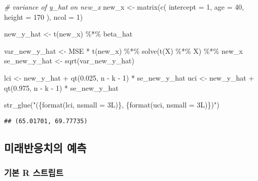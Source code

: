 \documentclass[
]{book}
\newenvironment{Shaded}{\begin{snugshade}}{\end{snugshade}}
\newcommand{\AttributeTok}[1]{\textcolor[rgb]{0.77,0.63,0.00}{#1}}
\newcommand{\CommentTok}[1]{\textcolor[rgb]{0.56,0.35,0.01}{\textit{#1}}}
\newcommand{\DecValTok}[1]{\textcolor[rgb]{0.00,0.00,0.81}{#1}}
\newcommand{\FloatTok}[1]{\textcolor[rgb]{0.00,0.00,0.81}{#1}}
\newcommand{\FunctionTok}[1]{\textcolor[rgb]{0.00,0.00,0.00}{#1}}
\newcommand{\NormalTok}[1]{#1}
\newcommand{\OtherTok}[1]{\textcolor[rgb]{0.56,0.35,0.01}{#1}}
\newcommand{\SpecialCharTok}[1]{\textcolor[rgb]{0.00,0.00,0.00}{#1}}
\newcommand{\StringTok}[1]{\textcolor[rgb]{0.31,0.60,0.02}{#1}}
\begin{document}
\begin{Shaded}
\begin{Highlighting}[]
\CommentTok{\# variance of y\_hat on new\_x}
\NormalTok{new\_x }\OtherTok{\textless{}{-}} \FunctionTok{matrix}\NormalTok{(}\FunctionTok{c}\NormalTok{(}
  \AttributeTok{intercept =} \DecValTok{1}\NormalTok{,}
  \AttributeTok{age =} \DecValTok{40}\NormalTok{,}
  \AttributeTok{height =} \DecValTok{170}
\NormalTok{), }\AttributeTok{ncol =} \DecValTok{1}\NormalTok{)}

\NormalTok{new\_y\_hat }\OtherTok{\textless{}{-}} \FunctionTok{t}\NormalTok{(new\_x) }\SpecialCharTok{\%*\%}\NormalTok{ beta\_hat}

\NormalTok{var\_new\_y\_hat }\OtherTok{\textless{}{-}}\NormalTok{ MSE }\SpecialCharTok{*} \FunctionTok{t}\NormalTok{(new\_x) }\SpecialCharTok{\%*\%} \FunctionTok{solve}\NormalTok{(}\FunctionTok{t}\NormalTok{(X) }\SpecialCharTok{\%*\%}\NormalTok{ X) }\SpecialCharTok{\%*\%}\NormalTok{ new\_x}
\NormalTok{se\_new\_y\_hat }\OtherTok{\textless{}{-}} \FunctionTok{sqrt}\NormalTok{(var\_new\_y\_hat)}

\NormalTok{lci }\OtherTok{\textless{}{-}}\NormalTok{ new\_y\_hat }\SpecialCharTok{+} \FunctionTok{qt}\NormalTok{(}\FloatTok{0.025}\NormalTok{, n }\SpecialCharTok{{-}}\NormalTok{ k }\SpecialCharTok{{-}} \DecValTok{1}\NormalTok{) }\SpecialCharTok{*}\NormalTok{ se\_new\_y\_hat}
\NormalTok{uci }\OtherTok{\textless{}{-}}\NormalTok{ new\_y\_hat }\SpecialCharTok{+} \FunctionTok{qt}\NormalTok{(}\FloatTok{0.975}\NormalTok{, n }\SpecialCharTok{{-}}\NormalTok{ k }\SpecialCharTok{{-}} \DecValTok{1}\NormalTok{) }\SpecialCharTok{*}\NormalTok{ se\_new\_y\_hat}

\FunctionTok{str\_glue}\NormalTok{(}\StringTok{"(\{format(lci, nsmall = 3L)\}, \{format(uci, nsmall = 3L)\})"}\NormalTok{)}
\end{Highlighting}
\end{Shaded}

\begin{verbatim}
## (65.01701, 69.77735)
\end{verbatim}

\hypertarget{regression-response-prediction}{%
\subsection{미래반응치의 예측}\label{regression-response-prediction}}

\hypertarget{regression-response-prediction-basic-script}{%
\subsubsection{기본 R 스트립트}\label{regression-response-prediction-basic-script}}
\end{document}
